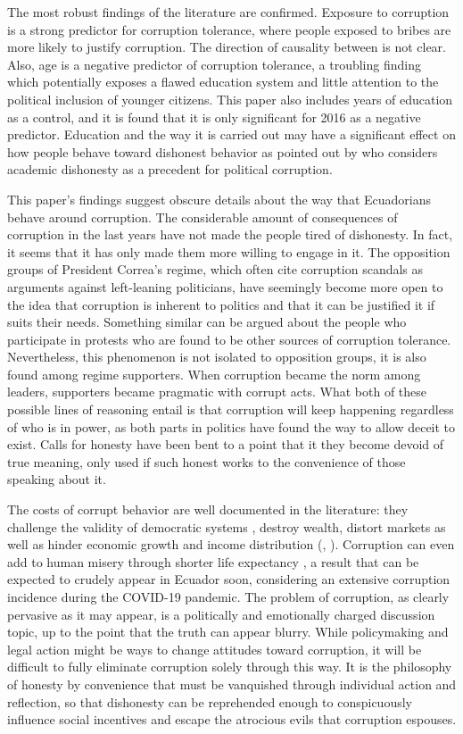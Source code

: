 \documentclass[12pt,a4]{article}\usepackage[]{graphicx}\usepackage[]{xcolor}
\begin{document}
The most robust findings of the literature are confirmed. Exposure to corruption is a strong predictor for corruption tolerance, where people exposed to bribes are more likely to justify corruption. The direction of causality between is not clear. Also, age is a negative predictor of corruption tolerance, a troubling finding which potentially exposes a flawed education system and little attention to the political inclusion of younger citizens. This paper also includes years of education as a control, and it is found that it is only significant for 2016 as a negative predictor. Education and the way it is carried out may have a significant effect on how people behave toward dishonest behavior as pointed out by \textcite{Adoum.2000} who considers academic dishonesty as a precedent for political corruption. 

This paper's findings suggest obscure details about the way that Ecuadorians behave around corruption. The considerable amount of consequences of corruption in the last years have not made the people tired of dishonesty. In fact, it seems that it has only made them more willing to engage in it. The opposition groups of President Correa's regime, which often cite corruption scandals as arguments against left-leaning politicians, have seemingly become more open to the idea that corruption is inherent to politics and that it can be justified it if suits their needs. Something similar can be argued about the people who participate in protests who are found to be other sources of corruption tolerance. Nevertheless, this phenomenon is not isolated to opposition groups, it is also found among regime supporters. When corruption became the norm among leaders, supporters became pragmatic with corrupt acts. What both of these possible lines of reasoning entail is that corruption will keep happening regardless of who is in power, as both parts in politics have found the way to allow deceit to exist. Calls for honesty have been bent to a point that it they become devoid of true meaning, only used if such honest works to the convenience of those speaking about it. 

The costs of corrupt behavior are well documented in the literature: they challenge the validity of democratic systems \parencite{Moscoso.2018}, destroy wealth, distort markets as well as hinder economic growth and income distribution (\textcite{Shleifer.1993}, \textcite{Singer.2016}). Corruption can even add to human misery through shorter life expectancy \parencite{Siverson.2014}, a result that can be expected to crudely appear in Ecuador soon, considering an extensive corruption incidence during the COVID-19 pandemic. The problem of corruption, as clearly pervasive as it may appear, is a politically and emotionally charged discussion topic, up to the point that the truth can appear blurry. While policymaking and legal action might be ways to change attitudes toward corruption, it will be difficult to fully eliminate corruption solely through this way. It is the philosophy of honesty by convenience that must be vanquished through individual action and reflection, so that dishonesty can be reprehended enough to conspicuously influence social incentives and escape the atrocious evils that corruption espouses. 
\end{document}
